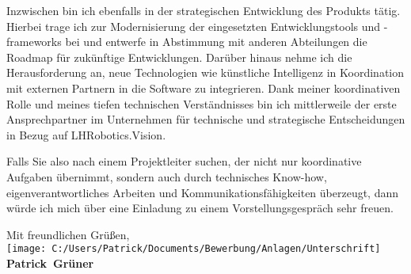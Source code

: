 \documentclass[10pt,a4paper]{article}
\def\firstname{Patrick}
\def\familyname{Grüner}
\begin{document}
Inzwischen bin ich ebenfalls in der strategischen Entwicklung des Produkts tätig. Hierbei trage ich zur Modernisierung der eingesetzten Entwicklungstools und -frameworks bei und entwerfe in Abstimmung mit anderen Abteilungen die Roadmap für zukünftige Entwicklungen. Darüber hinaus nehme ich die Herausforderung an, neue Technologien wie künstliche Intelligenz in Koordination mit externen Partnern in die Software zu integrieren. Dank meiner koordinativen Rolle und meines tiefen technischen Verständnisses bin ich mittlerweile der erste Ansprechpartner im Unternehmen für technische und strategische Entscheidungen in Bezug auf LHRobotics.Vision.

Falls Sie also nach einem Projektleiter suchen, der nicht nur koordinative Aufgaben übernimmt, sondern auch durch technisches Know-how, eigenverantwortliches Arbeiten und Kommunikationsfähigkeiten überzeugt, dann würde ich mich über eine Einladung zu einem Vorstellungsgespräch sehr freuen.

Mit freundlichen Grüßen,\\[3em]

\texttt{[image: C:/Users/Patrick/Documents/Bewerbung/Anlagen/Unterschrift]}\\
{\bfseries \firstname~\familyname}\\
%
\vfill%
\end{document}
